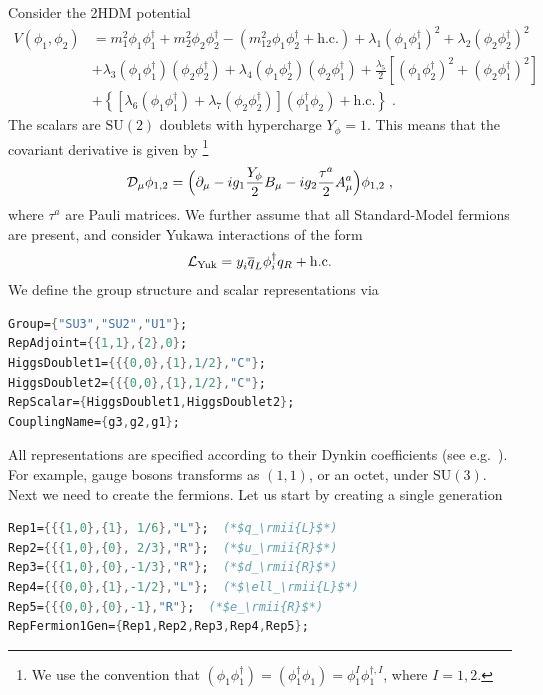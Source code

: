 \documentclass[11pt]{article}
\renewcommand{\nn}{\nonumber \\}
\renewcommand{\rmi}[1]{{\mbox{\scriptsize #1}}}
\newcommand{\rmii}[1]{{\mbox{\tiny\rm{#1}}}}
\begin{document}
Consider the 2HDM potential~\cite{Branco:2011iw,Gunion:1989we}
\begin{align}
\label{eq:V-2hdm}
    V(\phi_1,\phi_2) 
&=
    m_1^2 \phi_1^{ } \phi_1^\dagger
  + m_2^2 \phi_2^{ } \phi_2^\dagger
  - (m_{12}^2 \phi_1^{ } \phi_2^\dagger
    + \text{h.c.} )
  + \lambda_1^{ }(\phi_1^{ } \phi_1^\dagger)^2
  + \lambda_2^{ }(\phi_2^{ } \phi_2^\dagger)^2
  \nn &
  + \lambda_3^{ }(\phi_1^{ } \phi_1^\dagger )(\phi_2^{ } \phi_2^\dagger)
  + \lambda_4^{ }(\phi_1^{ } \phi_2^\dagger )(\phi_2^{ } \phi_1^\dagger)
  + \frac{\lambda_5}{2}\left[
      (\phi_1^{ } \phi_2^\dagger)^2
    + (\phi_2^{ } \phi_1^\dagger)^2
  \right]
  \nn &
  +\left\{
    \left[
        \lambda_6^{ }(\phi_1^{ } \phi_1^\dagger)
      + \lambda_7^{ }(\phi_2^{ } \phi_2^\dagger)
    \right]
  (\phi_1^\dagger \phi_2^{ })
  + \mathrm{h.c.}
  \right\}
  \;.
\end{align}
The scalars are $\mathrm{SU}(2)$ doublets with hypercharge $Y_\phi=1$.
This means that the covariant derivative is given by%
\footnote{
  We use the convention that
  $
  (\phi_1^{ } \phi_1^\dagger)=
  (\phi_1^\dagger \phi_1^{ })=\phi_1^{I} \phi_1^{\dagger,I}$,
  where $I=1,2$.
}
\begin{align}
\label{eq:D:2hdm}
  \mathcal{D}_\mu \phi_{1,2}=
    \Bigl(
      \partial_\mu
      - i g_1 \frac{Y_\phi}{2} B_{\mu}
      - i g_2 \frac{\tau^a}{2} A^a_{\mu}
    \Bigr)\phi_{1,2}
    \;,
\end{align}
where $\tau^a$ are Pauli matrices.
We further assume that all Standard-Model fermions are present, and consider Yukawa interactions of the form
\begin{align}
    \mathcal{L}_\rmi{Yuk}=y_{i}^{ } \overline{q}_L \phi^\dagger_i q_R
  + \mathrm{h.c.} 
\end{align}
We define the group structure and scalar representations via
\begin{lstlisting}[language=Mathematica,mathescape=true]
Group={"SU3","SU2","U1"};
RepAdjoint={{1,1},{2},0};
HiggsDoublet1={{{0,0},{1},1/2},"C"};
HiggsDoublet2={{{0,0},{1},1/2},"C"};
RepScalar={HiggsDoublet1,HiggsDoublet2};
CouplingName={g3,g2,g1};
\end{lstlisting}
All representations are specified according to their Dynkin coefficients
(see e.g.~\cite{Georgi:1999wka,Slansky:1981yr,Fonseca:2020vke}).
For example, gauge bosons transforms as $(1,1)$, or an octet, under $\mathrm{SU}(3)$.
Next we need to create the fermions. Let us start by creating a single generation
\begin{lstlisting}[language=Mathematica,mathescape=true]
Rep1={{{1,0},{1}, 1/6},"L"};  (*$q_\rmii{L}$*)
Rep2={{{1,0},{0}, 2/3},"R"};  (*$u_\rmii{R}$*)
Rep3={{{1,0},{0},-1/3},"R"};  (*$d_\rmii{R}$*)
Rep4={{{0,0},{1},-1/2},"L"};  (*$\ell_\rmii{L}$*)
Rep5={{{0,0},{0},-1},"R"};  (*$e_\rmii{R}$*)
RepFermion1Gen={Rep1,Rep2,Rep3,Rep4,Rep5};
\end{lstlisting}
\end{document}

